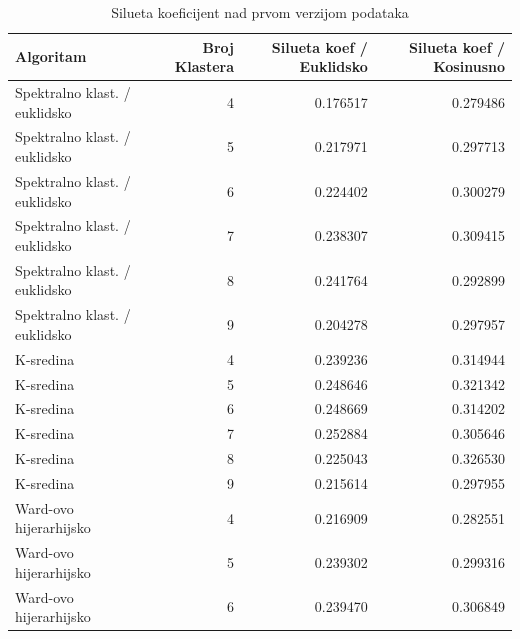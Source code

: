 \documentclass[a4paper]{article}
\begin{document}
\begin{center}
\begin{table}[H]
\caption{Silueta koeficijent nad prvom verzijom podataka}
\begin{adjustbox}{width=1\textwidth}
\begin{tabular}{lrrr}
\toprule
                     Algoritam &  Broj Klastera &  Silueta koef / Euklidsko &  Silueta koef / Kosinusno \\
\midrule
 Spektralno klast. / euklidsko &              4 &                  0.176517 &                  0.279486 \\
 Spektralno klast. / euklidsko &              5 &                  0.217971 &                  0.297713 \\
 Spektralno klast. / euklidsko &              6 &                  0.224402 &                  0.300279 \\
 Spektralno klast. / euklidsko &              7 &                  0.238307 &                  0.309415 \\
 Spektralno klast. / euklidsko &              8 &                  0.241764 &                  0.292899 \\
 Spektralno klast. / euklidsko &              9 &                  0.204278 &                  0.297957 \\
                     K-sredina &              4 &                  0.239236 &                  0.314944 \\
                     K-sredina &              5 &                  0.248646 &                  0.321342 \\
                     K-sredina &              6 &                  0.248669 &                  0.314202 \\
                     K-sredina &              7 &                  0.252884 &                  0.305646 \\
                     K-sredina &              8 &                  0.225043 &                  0.326530 \\
                     K-sredina &              9 &                  0.215614 &                  0.297955 \\
        Ward-ovo hijerarhijsko &              4 &                  0.216909 &                  0.282551 \\
        Ward-ovo hijerarhijsko &              5 &                  0.239302 &                  0.299316 \\
        Ward-ovo hijerarhijsko &              6 &                  0.239470 &                  0.306849 \\
\bottomrule
\end{tabular}
\end{adjustbox}
\label{grp1_v2_sil}
\end{table}
\end{center}
\end{document}
